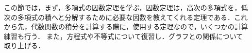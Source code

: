 \begin{comment}
\begin{table}[!h]
	\centering
	\caption{代数式}
	\[
		\text{代数式}
		\begin{cases}
			\text{有理式}
			\begin{cases}
				\text{多項式} 
				\begin{cases}
					\text{定数式} & 3, c\\
					\text{一次式} & ax+b \\
					\text{二次式} & ax^2+bx+c \\
					\text{$n$次式} & \sum_{i=0}^{n}a_ix^i
				\end{cases} \\
				\text{分数式} & \hspace*{-23mm}a/x
			\end{cases} \\
			\text{無理式} & \hspace*{-10mm}\sqrt{x}
		\end{cases}
	\]
\end{table}
\end{comment}

この節では，まず，多項式の因数定理を学ぶ，因数定理は，高次の多項式を，低次の多項式の積へと分解するために必要な因数を教えてくれる定理である．これから先，代数関数の積分を計算する際に，使用する定理なので，いくつかの計算練習も行う．
また，方程式や不等式について復習し．グラフとの関係について取り上げる．

